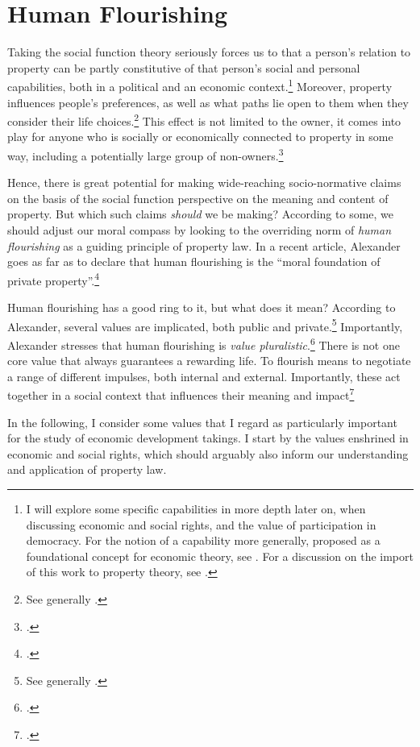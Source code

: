\section{Human Flourishing}\label{sec:2:5}

Taking the social function theory seriously forces us to  that a person's relation to property can be partly constitutive of that person's social and personal capabilities, both in a political and an economic context.\footnote{I will explore some specific capabilities in more depth later on, when discussing economic and social rights, and the value of participation in democracy. For the notion of a capability more generally, proposed as a foundational concept for economic theory, see \cite{sen85}. For a discussion on the import of this work to property theory, see \cite[105]{alexander09}.} Moreover, property influences people's preferences, as well as what paths lie open to them when they consider their life choices.\footnote{See generally \cite{alexander09}.} This effect is not limited to the owner, it comes into play for anyone who is socially or economically connected to property in some way, including a potentially large group of non-owners.\footcite[128-129]{alexander09d}

Hence, there is great potential for making wide-reaching socio-normative claims on the basis of the social function perspective on the meaning and content of property. But which such claims {\it should} we be making? According to some, we should adjust our moral compass by looking to the overriding norm of {\it human flourishing} as a guiding principle of property law. In a recent article, Alexander goes as far as to declare that human flourishing is the ``moral foundation of private property''.\footcite[1261]{alexander14} 

Human flourishing has a good ring to it, but what does it mean? According to Alexander, several values are implicated, both public and private.\footnote{See generally \cite{alexander14,alexander11}.} Importantly, Alexander stresses that human flourishing is {\it value pluralistic}.\footnote{\cite[750-751]{alexander09}.} There is not one core value that always guarantees a rewarding life. To flourish means to negotiate a range of different impulses, both internal and external. Importantly, these act together in a social context that influences their meaning and impact\footcite[1035-1052]{alexander11}

In the following, I consider some values that I regard as particularly important for the study of economic development takings. I start by the values enshrined in economic and social rights, which should arguably also inform our understanding and application of property law.

